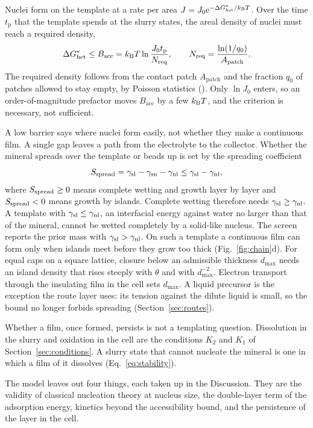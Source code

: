 Nuclei form on the template at a rate per area $J=J_0\mathrm{e}^{-\Delta G^{*}_\mathrm{het}/k_\mathrm{B} T}$. %
Over the time $t_\mathrm{p}$ that the template spends at the slurry states, the areal density of nuclei must reach a required density, %
\begin{equation}\label{eq:access}
\Delta G^{*}_\mathrm{het}\le B_\mathrm{acc}=k_\mathrm{B} T\ln\frac{J_0t_\mathrm{p}}{N_\mathrm{req}},\qquad N_\mathrm{req}=\frac{\ln(1/q_0)}{A_\mathrm{patch}}.
\end{equation}
The required density follows from the contact patch $A_\mathrm{patch}$ and the fraction $q_0$ of patches allowed to stay empty, by Poisson statistics (). %
Only $\ln J_0$ enters, so an order-of-magnitude prefactor moves $B_\mathrm{acc}$ by a few $k_\mathrm{B} T$, and the criterion is necessary, not sufficient. %

A low barrier says where nuclei form easily, not whether they make a continuous film. %
A single gap leaves a path from the electrolyte to the collector. %
Whether the mineral spreads over the template or beads up is set by the spreading coefficient %
\begin{equation}\label{eq:spread}
S_\mathrm{spread}=\gamma_\mathrm{sl}-\gamma_\mathrm{sn}-\gamma_\mathrm{nl}\le\gamma_\mathrm{sl}-\gamma_\mathrm{nl},
\end{equation}
where $S_\mathrm{spread}\ge0$ means complete wetting and growth layer by layer and $S_\mathrm{spread}<0$ means growth by islands. %
Complete wetting therefore needs $\gamma_\mathrm{sl}\ge\gamma_\mathrm{nl}$. %
A template with $\gamma_\mathrm{sl}\le\gamma_\mathrm{nl}$, an interfacial energy against water no larger than that of the mineral, cannot be wetted completely by a solid-like nucleus. %
The screen reports the prior mass with $\gamma_\mathrm{sl}>\gamma_\mathrm{nl}$. %
On such a template a continuous film can form only when islands meet before they grow too thick (Fig.~\ref{fig:chain}d). %
For equal caps on a square lattice, closure below an admissible thickness $d_\mathrm{max}$ needs an island density that rises steeply with $\theta$ and with $d_\mathrm{max}^{-2}$. %
Electron transport through the insulating film in the cell sets $d_\mathrm{max}$. %
A liquid precursor is the exception the route layer uses: its tension against the dilute liquid is small, so the bound no longer forbids spreading (Section~\ref{sec:routes}). %

Whether a film, once formed, persists is not a templating question. %
Dissolution in the slurry and oxidation in the cell are the conditions $K_2$ and $K_1$ of Section~\ref{sec:conditions}. %
A slurry state that cannot nucleate the mineral is one in which a film of it dissolves (Eq.~\eqref{eq:stability}). %

The model leaves out four things, each taken up in the Discussion. %
They are the validity of classical nucleation theory at nucleus size, the double-layer term of the adsorption energy, kinetics beyond the accessibility bound, and the persistence of the layer in the cell. %
